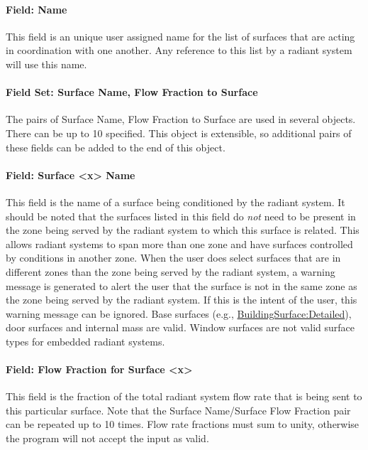 \paragraph{Field: Name}\label{field-name-8-015}

This field is an unique user assigned name for the list of surfaces that are acting in coordination with one another. Any reference to this list by a radiant system will use this name.

\paragraph{Field Set: Surface Name, Flow Fraction to Surface}\label{field-set-surface-name-flow-fraction-to-surface}

The pairs of Surface Name, Flow Fraction to Surface are used in several objects. There can be up to 10 specified. This object is extensible, so additional pairs of these fields can be added to the end of this object.

\paragraph{Field: Surface \textless{}x\textgreater{} Name}\label{field-surface-x-name-2}

This field is the name of a surface being conditioned by the radiant system. It should be noted that the surfaces listed in this field do \emph{not} need to be present in the zone being served by the radiant system to which this surface is related. This allows radiant systems to span more than one zone and have surfaces controlled by conditions in another zone. When the user does select surfaces that are in different zones than the zone being served by the radiant system, a warning message is generated to alert the user that the surface is not in the same zone as the zone being served by the radiant system. If this is the intent of the user, this warning message can be ignored. Base surfaces (e.g., \hyperref[buildingsurfacedetailed]{BuildingSurface:Detailed}), door surfaces and internal mass are valid. Window surfaces are not valid surface types for embedded radiant systems.

\paragraph{Field: Flow Fraction for Surface \textless{}x\textgreater{}}\label{field-flow-fraction-for-surface-x}

This field is the fraction of the total radiant system flow rate that is being sent to this particular surface. Note that the Surface Name/Surface Flow Fraction pair can be repeated up to 10 times. Flow rate fractions must sum to unity, otherwise the program will not accept the input as valid.

